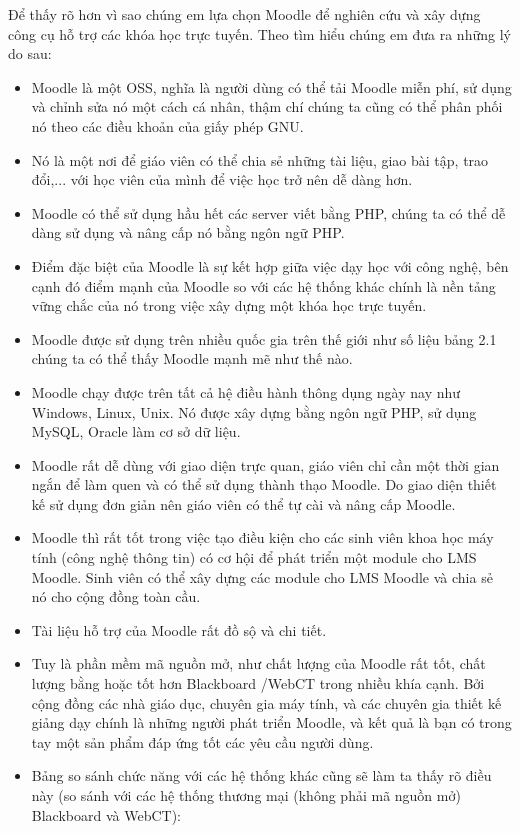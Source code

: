 Để thấy rõ hơn vì sao chúng em lựa chọn Moodle để nghiên cứu và xây dựng công cụ hỗ trợ các khóa học trực tuyến. Theo tìm hiểu chúng em đưa ra những lý do sau: \cite{whymoodle}
\begin{itemize}
	\item Moodle là một OSS, nghĩa là người dùng có thể tải Moodle miễn phí, sử dụng và chỉnh sửa nó một cách cá nhân, thậm chí chúng ta cũng có thể phân phối nó theo các điều khoản của giấy phép GNU.
	\item Nó là một nơi để giáo viên có thể chia sẻ những tài liệu, giao bài tập, trao đổi,... với học viên của mình để việc học trở nên dễ dàng hơn.
	\item Moodle có thể sử dụng hầu hết các server viết bằng PHP, chúng ta có thể dễ dàng sử dụng và nâng cấp nó bằng ngôn ngữ PHP.
	\item Điểm đặc biệt của Moodle là sự kết hợp giữa việc dạy học với công nghệ, bên cạnh đó điểm mạnh của Moodle so với các hệ thống khác chính là nền tảng vững chắc của nó trong việc xây dựng một khóa học trực tuyến.
	\item Moodle được sử dụng trên nhiều quốc gia trên thế giới như số liệu bảng 2.1 chúng ta có thể thấy Moodle mạnh mẽ như thế nào.
	\item Moodle chạy được trên tất cả hệ điều hành thông dụng ngày nay như Windows, Linux, Unix. Nó được xây dựng bằng ngôn ngữ PHP, sử dụng MySQL, Oracle làm cơ sở dữ liệu.
	\item Moodle rất dễ dùng với giao diện trực quan, giáo viên chỉ cần một thời gian ngắn để làm quen và có thể sử dụng thành thạo Moodle. Do giao diện thiết kế sử dụng đơn giản nên giáo viên có thể tự cài và nâng cấp Moodle.
	\item Moodle thì rất tốt trong việc tạo điều kiện cho các sinh viên khoa học máy tính (công nghệ thông tin) có cơ hội để phát triển một module cho LMS Moodle. Sinh viên có thể xây dựng các module cho LMS Moodle và chia sẻ nó cho cộng đồng toàn cầu. 
	\item Tài liệu hỗ trợ của Moodle rất đồ sộ và chi tiết.
	\item Tuy là phần mềm mã nguồn mở, như chất lượng của Moodle rất tốt, chất lượng bằng hoặc tốt hơn Blackboard /WebCT trong nhiều khía cạnh. Bởi cộng đồng các nhà giáo dục, chuyên gia máy tính, và các chuyên gia thiết kế giảng dạy chính là những người phát triển Moodle, và kết quả là bạn có trong tay một sản phẩm đáp ứng tốt các yêu cầu người dùng.
	\item Bảng so sánh chức năng với các hệ thống khác cũng sẽ làm ta thấy rõ điều này (so sánh với các hệ thống thương mại (không phải mã nguồn mở) Blackboard và WebCT): \cite{moodle-blackboard-webct}

\end{itemize}
